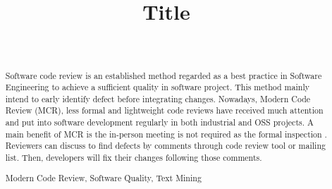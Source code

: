 \documentclass[conference]{IEEEtran}
\begin{document}
\title{Title}

\author{
\\


}


\maketitle
{}
{\newcommand{\nbnote}[2]{
  \fcolorbox{blue}{yellow}{\bfseries\sffamily\scriptsize#1}
  {\sf\small\textit{#2}}
 }
}
{\newcommand{\nbnote}[2]{}
 \newcommand{\version}{}
}
\newcommand\pick[1]{\nbnote{Pick sez}{\textcolor{magenta}{#1}}}
\newcommand\thai[1]{\nbnote{Thai sez}{\textcolor{blue}{#1}}}


\begin{abstract}
Software code review is an established method regarded as a best practice in Software Engineering to achieve a sufficient quality in software project. This method mainly intend to early identify defect before integrating changes. Nowadays, Modern Code Review (MCR)\cite{Bacchelli2013a}, less formal and lightweight code reviews have received much attention and  put into software development regularly in both industrial and OSS projects. A main benefit of MCR is the in-person meeting is not required as the formal inspection \cite{Fagan:1976:DCI:1661010.1661012}. Reviewers can discuss to find defects by comments through code review tool or mailing list. Then, developers will fix their changes following those comments. 



\begin{IEEEkeywords}
Modern Code Review, Software Quality, Text Mining
\end{IEEEkeywords}
\end{abstract}
\end{document}
